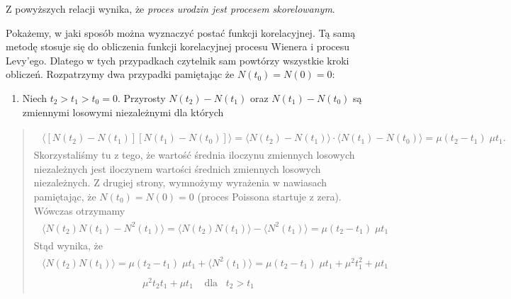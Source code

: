 \documentclass[a4paper,12pt,polish]{sphinxmanual}
\begin{document}
Z powyższych relacji wynika, że \emph{proces urodzin jest procesem skorelowanym}.

Pokażemy, w jaki sposób można wyznaczyć postać funkcji korelacyjnej. Tą samą metodę stosuje się do obliczenia funkcji korelacyjnej procesu Wienera i procesu Levy'ego. Dlatego w tych przypadkach czytelnik sam powtórzy wszystkie kroki obliczeń. Rozpatrzymy dwa przypadki pamiętając że $N(t_0) = N(0) =0$:
\begin{enumerate}
\item {} 
Niech $t_2 > t_1 > t_0=0$. Przyrosty $N(t_2) - N(t_1)$ oraz $N(t_1) - N(t_0)$ są zmiennymi losowymi niezależnymi dla których

\end{enumerate}
\begin{quote}
\label{ch3/chIII021:equation-eqn35}\begin{gather}
\begin{split}\langle[N(t_2) - N(t_1)] [ N(t_1) - N(t_0)] \rangle = \langle N(t_2) - N(t_1) \rangle \cdot \langle N(t_1) - N(t_0) \rangle = \mu (t_2 -t_1) \; \mu t_1.\end{split}\label{ch3/chIII021-eqn35}
\end{gather}
Skorzystaliśmy tu z tego, że wartość średnia iloczynu zmiennych losowych niezależnych jest iloczynem wartości średnich zmiennych losowych niezależnych. Z drugiej strony, wymnożymy wyrażenia w nawiasach pamiętając, że $N(t_0) = N(0) = 0$ (proces Poissona startuje z zera). Wówczas otrzymamy
\label{ch3/chIII021:equation-eqn36}\begin{gather}
\begin{split}\langle N(t_2) N(t_1) - N^2(t_1) \rangle = \langle N(t_2) N(t_1) \rangle - \langle N^2(t_1)\rangle =\mu (t_2 -t_1) \; \mu t_1\end{split}\label{ch3/chIII021-eqn36}
\end{gather}
Stąd wynika, że
\label{ch3/chIII021:equation-eqn37}\begin{gather}
\begin{split}\langle N(t_2) N(t_1) \rangle = \mu (t_2 -t_1) \; \mu t_1 +\langle N^2(t_1)\rangle = \mu (t_2 -t_1) \; \mu t_1 + \mu^2 t_1^2 + \mu t_1\end{split}\label{ch3/chIII021-eqn37}
\end{gather}\label{ch3/chIII021:equation-eqn38}\begin{gather}
\begin{split}\mu^2 t_2 t_1 + \mu t_1 \; \; \; \; \mbox{dla} \; \; \; t_2 > t_1\end{split}\label{ch3/chIII021-eqn38}
\end{gather}\end{quote}
\end{document}
